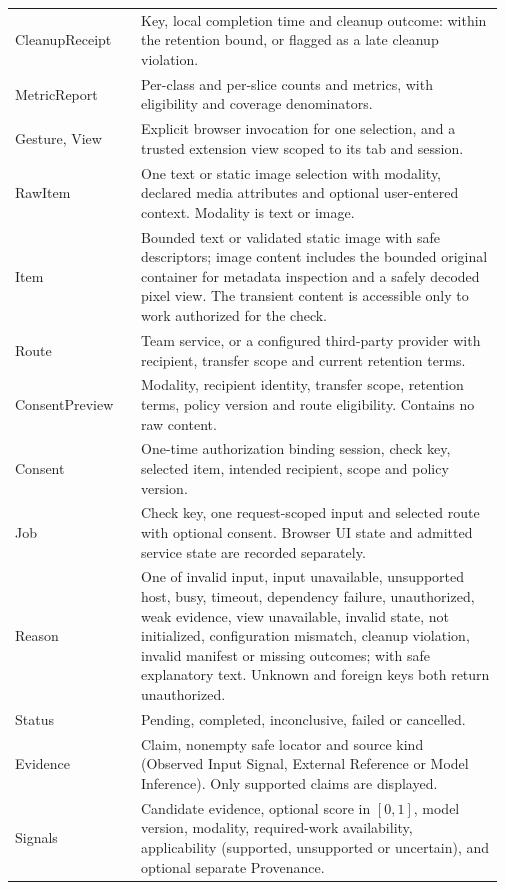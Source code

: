 \documentclass[12pt, titlepage]{article}
\newcommand{\ty}[1]{\textsf{#1}}
\begin{document}
\begin{longtable}{@{}p{0.25\linewidth}p{0.72\linewidth}@{}}
\ty{CleanupReceipt} & Key, local completion time and cleanup outcome: within the retention bound, or flagged as a late cleanup violation. \\
\ty{MetricReport} & Per-class and per-slice counts and metrics, with eligibility and coverage denominators. \\
\ty{Gesture}, \ty{View} & Explicit browser invocation for one selection, and a trusted extension view scoped to its tab and session. \\
\ty{RawItem} & One text or static image selection with modality, declared media attributes and optional user-entered context. Modality is text or image. \\
\ty{Item} & Bounded text or validated static image with safe descriptors; image content includes the bounded original container for metadata inspection and a safely decoded pixel view. The transient content is accessible only to work authorized for the check. \\
\ty{Route} & Team service, or a configured third-party provider with recipient, transfer scope and current retention terms. \\
\ty{ConsentPreview} & Modality, recipient identity, transfer scope, retention terms, policy version and route eligibility. Contains no raw content. \\
\ty{Consent} & One-time authorization binding session, check key, selected item, intended recipient, scope and policy version. \\
\ty{Job} & Check key, one request-scoped input and selected route with optional consent. Browser UI state and admitted service state are recorded separately. \\
\ty{Reason} & One of invalid input, input unavailable, unsupported host, busy, timeout, dependency failure, unauthorized, weak evidence, view unavailable, invalid state, not initialized, configuration mismatch, cleanup violation, invalid manifest or missing outcomes; with safe explanatory text. Unknown and foreign keys both return unauthorized. \\
\ty{Status} & Pending, completed, inconclusive, failed or cancelled. \\
\ty{Evidence} & Claim, nonempty safe locator and source kind (Observed Input Signal, External Reference or Model Inference). Only supported claims are displayed. \\
\ty{Signals} & Candidate evidence, optional score in $[0,1]$, model version, modality, required-work availability, applicability (supported, unsupported or uncertain), and optional separate \ty{Provenance}. \\

\end{longtable}
\end{document}
